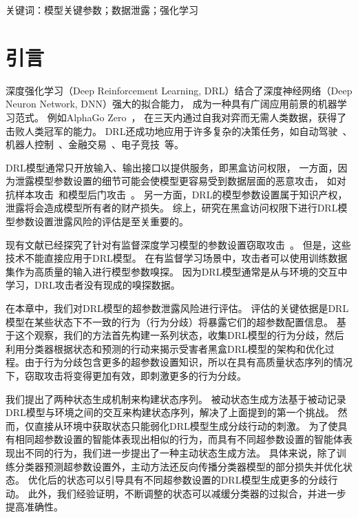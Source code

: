 关键词：模型关键参数；数据泄露；强化学习

\section{引言}

深度强化学习（Deep Reinforcement Learning, DRL）结合了深度神经网络（Deep Neuron Network, DNN）强大的拟合能力，
成为一种具有广阔应用前景的机器学习范式。
例如AlphaGo Zero~\cite{SSSAHGHBLB17}，
在三天内通过自我对弈而无需人类数据，获得了击败人类冠军的能力。
DRL还成功地应用于许多复杂的决策任务，如自动驾驶~\cite{FHOL18}、机器人控制~\cite{A17}、金融交易~\cite{DBKRD17}、电子竞技~\cite{SSSAHGHBLB17,BBCCDDFFHHJGOPPPRSSSSSTWZ19}等。

DRL模型通常只开放输入、输出接口以提供服务，即黑盒访问权限，
一方面，因为泄露模型参数设置的细节可能会使模型更容易受到数据层面的恶意攻击，
如对抗样本攻击~\cite{HPGDA17, BM17, LHLSLS17, KS17}和模型后门攻击~\cite{KWSL20,YIRV19,KWJL20,WSLMJ21,WJWGXS21}。
另一方面，DRL的模型参数设置属于知识产权，泄露将会造成模型所有者的财产损失。
综上，研究在黑盒访问权限下进行DRL模型参数设置泄露风险的评估是至关重要的。

现有文献已经探究了针对有监督深度学习模型的参数设置窃取攻击~\cite{OASF18,WG18}。
但是，这些技术不能直接应用于DRL模型。
在有监督学习场景中，攻击者可以使用训练数据集作为高质量的输入进行模型参数嗅探。
因为DRL模型通常是从与环境的交互中学习，DRL攻击者没有现成的嗅探数据。


在本章中，我们对DRL模型的超参数泄露风险进行评估。
评估的关键依据是DRL模型在某些状态下不一致的行为（行为分歧）将暴露它们的超参数配置信息。
基于这个观察，我们的方法首先构建一系列状态，收集DRL模型的行为分歧，然后利用分类器根据状态和预测的行动来揭示受害者黑盒DRL模型的架构和优化过程。由于行为分歧包含更多的超参数设置知识，所以在具有高质量状态序列的情况下，窃取攻击将变得更加有效，即刺激更多的行为分歧。

我们提出了两种状态生成机制来构建状态序列。 
被动状态生成方法基于被动记录DRL模型与环境之间的交互来构建状态序列，解决了上面提到的第一个挑战。
然而，仅直接从环境中获取状态只能弱化DRL模型生成分歧行动的刺激。
为了使具有相同超参数设置的智能体表现出相似的行为，而具有不同超参数设置的智能体表现出不同的行为，我们进一步提出了一种主动状态生成方法。
具体来说，除了训练分类器预测超参数设置外，主动方法还反向传播分类器模型的部分损失并优化状态。
优化后的状态可以引导具有不同超参数设置的DRL模型生成更多的分歧行动。
此外，我们经验证明，不断调整的状态可以减缓分类器的过拟合，并进一步提高准确性。

